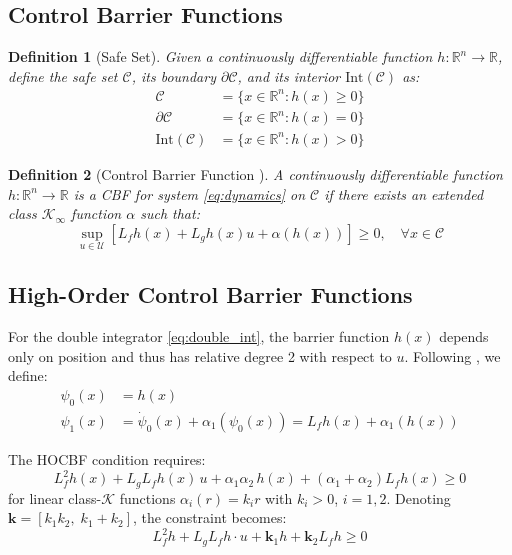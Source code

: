 \documentclass[letterpaper, 10 pt, conference]{ieeeconf}
\newtheorem{definition}{Definition}
\begin{document}
\subsection{Control Barrier Functions}

\begin{definition}[Safe Set]
Given a continuously differentiable function $h: \mathbb{R}^n \to \mathbb{R}$, define the safe set $\mathcal{C}$, its boundary $\partial \mathcal{C}$, and its interior $\text{Int}(\mathcal{C})$ as:
\begin{align}
    \mathcal{C} &= \{x \in \mathbb{R}^n : h(x) \geq 0\} \\
    \partial \mathcal{C} &= \{x \in \mathbb{R}^n : h(x) = 0\} \\
    \text{Int}(\mathcal{C}) &= \{x \in \mathbb{R}^n : h(x) > 0\}
\end{align}
\end{definition}

\begin{definition}[Control Barrier Function \cite{ames2017cbf}]
A continuously differentiable function $h: \mathbb{R}^n \to \mathbb{R}$ is a CBF for system \eqref{eq:dynamics} on $\mathcal{C}$ if there exists an extended class $\mathcal{K}_\infty$ function $\alpha$ such that:
\begin{equation}\label{eq:cbf_condition}
    \sup_{u \in \mathcal{U}} \left[ L_f h(x) + L_g h(x) u + \alpha(h(x)) \right] \geq 0, \quad \forall x \in \mathcal{C}
\end{equation}
\end{definition}

\subsection{High-Order Control Barrier Functions}

For the double integrator \eqref{eq:double_int}, the barrier function $h(x)$ depends only on position and thus has relative degree 2 with respect to $u$. Following \cite{xiao2019hocbf}, we define:
\begin{align}
    \psi_0(x) &= h(x) \\
    \psi_1(x) &= \dot{\psi}_0(x) + \alpha_1(\psi_0(x)) = L_f h(x) + \alpha_1(h(x))
\end{align}

The HOCBF condition requires:
\begin{equation}\label{eq:hocbf}
    L_f^2 h(x) + L_g L_f h(x) \, u + \alpha_1 \alpha_2 \, h(x) + (\alpha_1 + \alpha_2) L_f h(x) \geq 0
\end{equation}
for linear class-$\mathcal{K}$ functions $\alpha_i(r) = k_i r$ with $k_i > 0$, $i = 1, 2$. Denoting $\bm{k} = [k_1 k_2, \; k_1 + k_2]$, the constraint becomes:
\begin{equation}\label{eq:hocbf_compact}
    L_f^2 h + L_g L_f h \cdot u + \bm{k}_1 h + \bm{k}_2 L_f h \geq 0
\end{equation}
\end{document}
